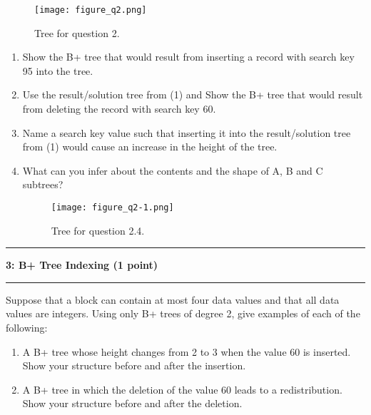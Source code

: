 \documentclass[11pt]{article}
\newcommand\question[2]{\vspace{.25in}\hrule\textbf{#1: #2}\vspace{.5em}\hrule\vspace{.10in}}
\begin{document}
\begin{figure}[h]
	\centering
	\texttt{[image: figure\_q2.png]}
	\caption{Tree for question 2.}
	\label{figure:q2}
\end{figure}

\begin{comment}
{"keys": [25,55,75],
 "children": [{"keys": [5,10,15,20]}, {"keys": [25,28,30,50]}, {"keys": [55,60,65,70]}, {"keys": [75,80,85,90]}]
}
\end{comment}

\begin{enumerate}
	\item Show the B+ tree that would result from inserting a record with search key 95 into the tree.
	

	\item Use the result/solution tree from (1) and Show the B+ tree that would result from deleting the record with search key 60.
	

	\item Name a search key value such that inserting it into the result/solution tree from (1) would cause an increase in the height of the tree.
	

	\item What can you infer about the contents and the shape of A, B and C subtrees?
	
	\begin{figure}[h]
	\centering
	\texttt{[image: figure\_q2-1.png]}
	\caption{Tree for question 2.4.}
	\label{figure:q2}
    \end{figure}


\end{enumerate}




\question{3}{B+ Tree Indexing (1 point)}
Suppose that a block can contain at most four data values and that all data values are integers. Using only B+ trees of degree 2, give examples of each of the following:
\begin{enumerate}
	\item A B+ tree whose height changes from 2 to 3 when the value 60 is inserted. Show your structure before and after the insertion.
	

	
	\item A B+ tree in which the deletion of the value 60 leads to a redistribution. Show your structure before and after the deletion.
	

\end{enumerate}
\end{document}
